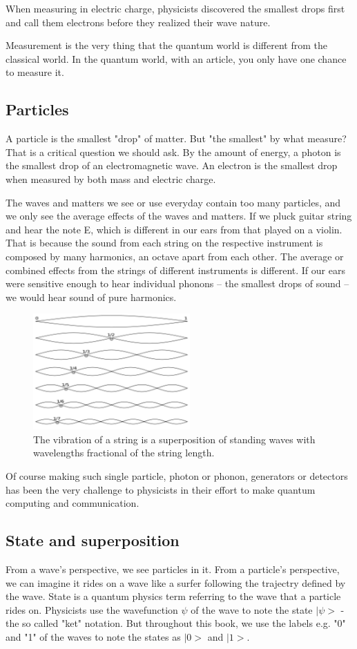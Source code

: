 \documentclass{book}
\begin{document}
When measuring in electric charge, physicists discovered the smallest drops first and call them electrons before they realized their wave nature.

Measurement is the very thing that the quantum world is different from the classical world. In the quantum world, with an article, you only have one chance to measure it. 

\subsection{Particles}
A particle is the smallest "drop" of matter. But "the smallest" by what measure? That is a critical question we should ask. By the amount of energy, a photon is the smallest drop of an electromagnetic wave. An electron is the smallest drop when measured by both mass and electric charge.

The waves and matters we see or use everyday contain too many particles, and we only see the average effects of the waves and matters. If we pluck guitar string and hear the note E, which is different in our ears from that played on a violin. That is because the sound from each string on the respective instrument is composed by many harmonics, an octave apart from each other. The average or combined effects from the strings of different instruments is different. If our ears were sensitive enough to hear individual phonons -- the smallest drops of sound -- we would hear sound of pure harmonics.
\begin{figure}[ht]
\includegraphics[width=6cm]{overtones.png}
\caption{The vibration of a string is a superposition of standing waves with wavelengths fractional of the string length.}
\label{Overtones}
\end{figure}
Of course making such single particle, photon or phonon, generators or detectors has been the very challenge to physicists in their effort to make quantum computing and communication.


\subsection{State and superposition}
From a wave's perspective, we see particles in it. From a particle's perspective, we can imagine it rides on a wave like a surfer following the trajectry defined by the wave. State is a quantum physics term referring to the wave that a particle rides on. Physicists use the wavefunction $\psi$ of the wave to note the state $|\psi>$ - the so called "ket" notation. But throughout this book, we use the labels e.g. "0" and "1" of the waves to note the states as $|0>$ and $|1>$. 
\end{document}
